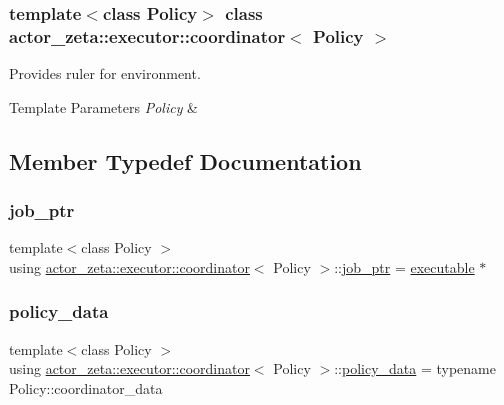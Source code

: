 \subsubsection*{template$<$class Policy$>$\newline
class actor\+\_\+zeta\+::executor\+::coordinator$<$ Policy $>$}

Provides ruler for environment. 


\begin{DoxyTemplParams}{Template Parameters}
{\em Policy} & \\
\hline
\end{DoxyTemplParams}


\subsection{Member Typedef Documentation}
\mbox{\label{classactor__zeta_1_1executor_1_1coordinator_a6104368cc7f2de545e7c242eda00fcf7}} 
\subsubsection{\texorpdfstring{job\+\_\+ptr}{job\_ptr}}
{\footnotesize\ttfamily template$<$class Policy $>$ \\
using \hyperlink{classactor__zeta_1_1executor_1_1coordinator}{actor\+\_\+zeta\+::executor\+::coordinator}$<$ Policy $>$\+::\hyperlink{classactor__zeta_1_1executor_1_1coordinator_a6104368cc7f2de545e7c242eda00fcf7}{job\+\_\+ptr} =  \hyperlink{structactor__zeta_1_1executor_1_1executable}{executable} $\ast$}

\mbox{\label{classactor__zeta_1_1executor_1_1coordinator_a81ac6921473ebffdc2a20df32249dbcc}} 
\subsubsection{\texorpdfstring{policy\+\_\+data}{policy\_data}}
{\footnotesize\ttfamily template$<$class Policy $>$ \\
using \hyperlink{classactor__zeta_1_1executor_1_1coordinator}{actor\+\_\+zeta\+::executor\+::coordinator}$<$ Policy $>$\+::\hyperlink{classactor__zeta_1_1executor_1_1coordinator_a81ac6921473ebffdc2a20df32249dbcc}{policy\+\_\+data} =  typename Policy\+::coordinator\+\_\+data}

